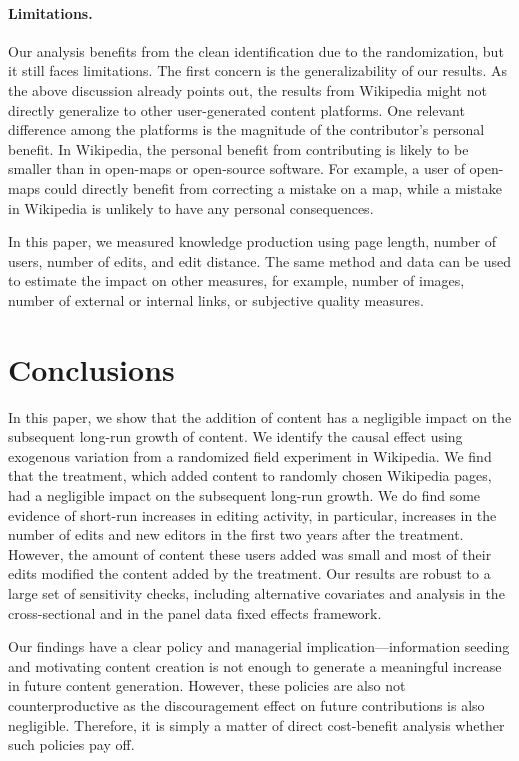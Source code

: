 \documentclass[12pt]{article}
\begin{document}
\paragraph{Limitations.}
Our analysis benefits from the clean identification due to the randomization, but it still faces limitations. The first concern is the generalizability of our results. 
As the above discussion already points out, the results from Wikipedia might not directly generalize to other  user-generated content platforms. One relevant difference among the platforms is the magnitude of the contributor's personal benefit. In Wikipedia, the personal benefit from contributing is likely to be smaller than in open-maps or open-source software. For example, a user of open-maps could directly benefit from correcting a mistake on a map, while a mistake in Wikipedia is unlikely to have any personal consequences. 

In this paper, we measured knowledge production using page length, number of users, number of edits, and edit distance. The same method and data can be used to estimate the impact on other measures, for example, number of images, number of external or internal links, or subjective quality measures.

\section{Conclusions} \label{S:Conclusions}

In this paper, we show that the addition of content has a negligible impact on the subsequent long-run growth of content. 
We identify the causal effect using exogenous variation from a randomized field experiment in Wikipedia. We find that the treatment, which added content to randomly chosen Wikipedia pages, had a negligible impact on the subsequent long-run growth. 
We do find some evidence of short-run increases in editing activity, in particular, increases in the number of edits and new editors in the first two years after the treatment. However, the amount of content these users added was small and most of their edits modified the content added by the treatment.
Our results are robust to a large set of sensitivity checks, including alternative covariates and analysis in the cross-sectional and in the panel data fixed effects framework. 

Our findings have a clear policy and managerial implication---information seeding and motivating content creation is not enough to generate a meaningful increase in future content generation. However, these policies are also not counterproductive as the discouragement effect on future contributions is also negligible. Therefore, it is simply a matter of direct cost-benefit analysis whether such policies pay off. 


{}



\appendix
{}

\pagebreak
\setcounter{page}{1}\newpage
\renewcommand{\thepage}{A\arabic{page}}



\end{document}

